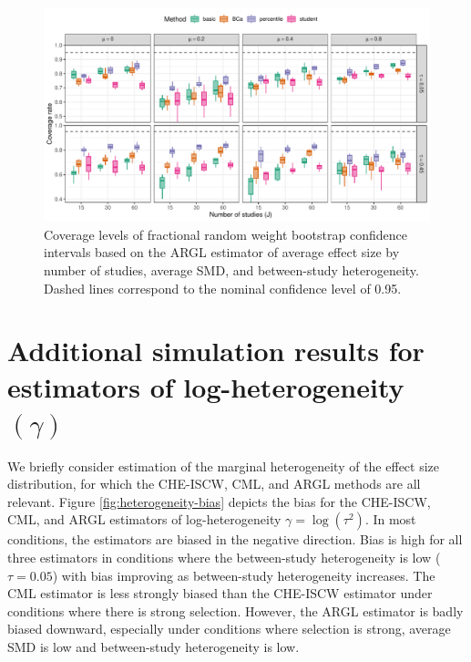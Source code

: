 \documentclass[
  american,
  man, donotrepeattitle,mask,floatsintext]{apa7}
\numberwithin{table}{section}
\numberwithin{equation}{section}
\numberwithin{figure}{section}
\begin{document}
\begin{figure}
\includegraphics{step-function-selection-models-supplementary-materials_files/figure-latex/ARGL-coverage-exponential-1} \caption{Coverage levels of fractional random weight bootstrap confidence intervals based on the ARGL estimator of average effect size by number of studies, average SMD, and between-study heterogeneity. Dashed lines correspond to the nominal confidence level of 0.95.}\label{fig:ARGL-coverage-exponential}
\end{figure}

\newpage

\section{\texorpdfstring{Additional simulation results for estimators of log-heterogeneity \((\gamma)\)}{Additional simulation results for estimators of log-heterogeneity (\textbackslash gamma)}}\label{gamma-simulation-results}

We briefly consider estimation of the marginal heterogeneity of the effect size distribution, for which the CHE-ISCW, CML, and ARGL methods are all relevant.
Figure \ref{fig:heterogeneity-bias} depicts the bias for the CHE-ISCW, CML, and ARGL estimators of log-heterogeneity \(\gamma = \log(\tau^2)\).
In most conditions, the estimators are biased in the negative direction.
Bias is high for all three estimators in conditions where the between-study heterogeneity is low (\(\tau = 0.05\)) with bias improving as between-study heterogeneity increases. The CML estimator is less strongly biased than the CHE-ISCW estimator under conditions where there is strong selection.
However, the ARGL estimator is badly biased downward, especially under conditions where selection is strong, average SMD is low and between-study heterogeneity is low.
\end{document}
